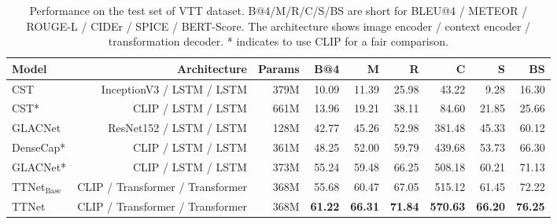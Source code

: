 \begin{table}[t]
\centering
\small
\caption{Performance on the test set of VTT dataset. B@4/M/R/C/S/BS are short for BLEU@4 / METEOR / ROUGE-L / CIDEr / SPICE / BERT-Score. The architecture shows image encoder / context encoder / transformation decoder. * indicates to use CLIP for a fair comparison.}
\label{tab:baseline}
\begin{tabular}{lrrrrrrrr}
\toprule
Model & Architecture & Params & B@4 & M & R & C & S & BS \\
\midrule
CST & InceptionV3 / LSTM / LSTM & 379M & 10.09 & 11.39 & 25.98 & 43.22 & 9.28 & 16.30 \\
CST* & CLIP / LSTM / LSTM & 661M & 13.96 & 19.21 & 38.11 & 84.60 & 21.85 & 25.66 \\
GLACNet & ResNet152 / LSTM / LSTM & 128M & 42.77 & 45.26 & 52.98 & 381.48 & 45.33 & 60.12 \\
DenseCap* & CLIP / LSTM / LSTM & 361M & 48.25 & 52.00 & 59.79 & 439.68 & 53.73 & 66.30 \\
GLACNet* & CLIP / LSTM / LSTM & 373M & 55.24 & 59.48 & 66.25 & 508.18 & 60.21 & 71.13 \\
TTNet$_\text{Base}$ & CLIP / Transformer / Transformer & 368M & 55.68 & 60.47 & 67.05 & 515.12 & 61.45 & 72.22 \\
TTNet & CLIP / Transformer / Transformer & 368M & \textbf{61.22} & \textbf{66.31} & \textbf{71.84} & \textbf{570.63} & \textbf{66.20} & \textbf{76.25} \\
\bottomrule
\end{tabular}
\end{table}
